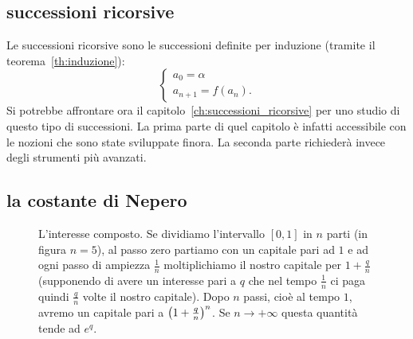 \subsection{successioni ricorsive}

Le successioni ricorsive sono le successioni
definite per induzione (tramite il teorema~\ref{th:induzione}):
\[
 \begin{cases}
   a_0 = \alpha \\
   a_{n+1} = f(a_n).
 \end{cases}
\]
Si potrebbe affrontare ora il capitolo~\ref{ch:successioni_ricorsive}
per uno studio di questo tipo di successioni.
La prima parte di quel capitolo è infatti accessibile con le nozioni
che sono state sviluppate finora.
La seconda parte richiederà invece degli strumenti più avanzati.

\subsection{la costante di Nepero}

\begin{figure}
  \begin{center}
  \end{center}
  \caption{L'interesse composto.
  Se dividiamo l'intervallo $[0,1]$
  in $n$ parti (in figura $n=5$), al passo zero
  partiamo con un capitale pari ad $1$ e ad ogni
  passo di ampiezza $\frac 1 n$ moltiplichiamo
  il nostro capitale per $1+\frac q n$ (supponendo
  di avere un interesse pari a $q$ che
  nel tempo $\frac 1 n$ ci paga quindi $\frac q n$
  volte il nostro capitale).
  Dopo
  $n$ passi, cioè al tempo $1$, avremo
  un capitale pari a ${\left( 1+\frac q n \right)}^n$.
  Se $n\to+\infty$ questa quantità tende ad $e^q$.}
  \label{fig:nepero}
\end{figure}


